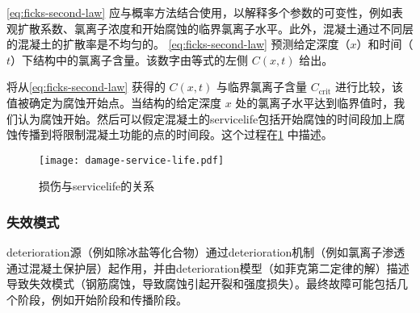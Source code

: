 \cref{eq:ficks-second-law} 应与概率方法结合使用，以解释多个参数的可变性，例如表观扩散系数、氯离子浓度和开始腐蚀的临界氯离子水平。此外，混凝土通过不同层的混凝土的扩散率是不均匀的。 \cref{eq:ficks-second-law} 预测给定深度（$x$）和时间（$t$）下结构中的氯离子含量。该数字由等式的左侧 $C(x,t)$ 给出。


将从\cref{eq:ficks-second-law} 获得的 $C(x,t)$ 与临界氯离子含量 $C_\text{crit}$ 进行比较，该值被确定为腐蚀开始点。当结构的给定深度 $x$ 处的氯离子水平达到临界值时，我们认为腐蚀开始。然后可以假定混凝土的\gls*{servicelife}包括开始腐蚀的时间段加上腐蚀传播到将限制混凝土功能的点的时间段。这个过程在\cref{fig:damage-service-life} 中描述。

\begin{figure}
  \texttt{[image: damage-service-life.pdf]}
  \caption{损伤与\gls*{servicelife}的关系}
  \label{fig:damage-service-life}
\end{figure}

\subsubsection*{失效模式}
\gls*{deterioration}源（例如除冰盐等化合物）通过\gls*{deterioration}机制（例如氯离子渗透通过混凝土保护层）起作用，并由\gls*{deterioration}模型（如菲克第二定律的解）描述导致失效模式（钢筋腐蚀，导致腐蚀引起开裂和强度损失）。最终故障可能包括几个阶段，例如开始阶段和传播阶段。

